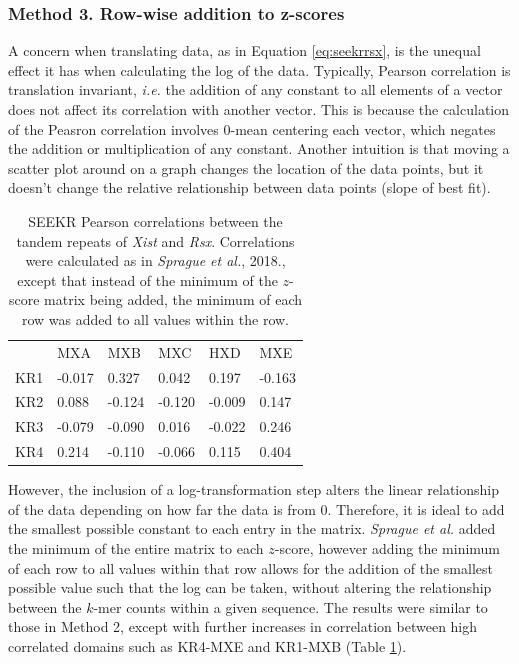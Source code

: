 \subsubsection{Method 3. Row-wise addition to z-scores}

A concern when translating data, as in Equation \ref{eq:seekrrsx}, is the unequal effect it has when calculating the log of the data. Typically, Pearson correlation is translation invariant, \emph{i.e.} the addition of any constant to all elements of a vector does not affect its correlation with another vector. This is because the calculation of the Peasron correlation involves 0-mean centering each vector, which negates the addition or multiplication of any constant. Another intuition is that moving a scatter plot around on a graph changes the location of the data points, but it doesn't change the relative relationship between data points (slope of best fit). 

\begin{table}[ht]
\begin{center}
\begin{tabular}{llllll}
&MXA & MXB                   & MXC                  & HXD                  & MXE                                  \\
KR1 & -0.017 & 0.327   & 0.042  & 0.197    & -0.163 \\
KR2 & 0.088   & -0.124 & -0.120 & -0.009 & 0.147 \\
KR3 & -0.079  & -0.090 & 0.016 & -0.022 & 0.246 \\
KR4 & 0.214    & -0.110 & -0.066  & 0.115   & 0.404
\end{tabular}
\caption[Row-wise minimum addition to $z$-score]{SEEKR Pearson correlations between the tandem repeats of \emph{Xist} and \emph{Rsx}. Correlations were calculated as in \emph{Sprague et al.}, 2018., except that instead of the minimum of the $z$-score matrix being added, the minimum of each row was added to all values within the row.}
\label{tbl:kmers3}
\end{center}
\end{table}

However, the inclusion of a log-transformation step alters the linear relationship of the data depending on how far the data is from 0. Therefore, it is ideal to add the smallest possible constant to each entry in the matrix. \emph{Sprague et al.} added the minimum of the entire matrix to each $z$-score, however adding the minimum of each row to all values within that row allows for the addition of the smallest possible value such that the log can be taken, without altering the relationship between the $k$-mer counts within a given sequence. The results were similar to those in Method 2, except with further increases in correlation between high correlated domains such as KR4-MXE and KR1-MXB (Table \ref{tbl:kmers3}). 

